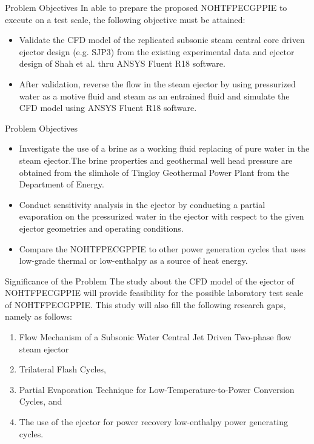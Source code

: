 \begin{frame}{Problem Objectives}
    In able to prepare the proposed NOHTFPECGPPIE to execute on a test scale, the following objective must be attained:
   \begin{itemize}
    \item Validate the CFD model of the replicated subsonic steam central core driven ejector design (e.g. SJP3) from the existing experimental data and ejector design of Shah et al. \cite{shah2014experimental} thru ANSYS Fluent R18 software.
    \item After validation, reverse the flow in the steam ejector by using pressurized water as a motive fluid and steam as an entrained fluid and simulate the CFD model using ANSYS Fluent R18 software.
  \end{itemize}
\end{frame}

\begin{frame}{Problem Objectives}
    \begin{itemize}
        \item Investigate the use of a brine as a working fluid replacing of pure water in the steam ejector.The brine properties and geothermal well head pressure are obtained from the slimhole of Tingloy Geothermal Power Plant from the Department of Energy.
        \item Conduct sensitivity analysis in the ejector by conducting a partial evaporation on the pressurized water in the ejector with respect to the given ejector geometries and operating conditions.
       \item Compare the NOHTFPECGPPIE to other power generation cycles that uses low-grade thermal or low-enthalpy as a source of heat energy.
    \end{itemize}
\end{frame}

\begin{frame}{Significance of the Problem}
    The study about the CFD model of the ejector of NOHTFPECGPPIE will provide feasibility for the possible laboratory test scale of NOHTFPECGPPIE. This study will also fill the following research gaps, namely as follows:
  \begin{enumerate}
    \item Flow Mechanism of a Subsonic Water Central Jet Driven Two-phase flow steam ejector
    \item Trilateral Flash Cycles, 
    \item Partial Evaporation Technique for Low-Temperature-to-Power Conversion Cycles, and 
    \item The use of the ejector for power recovery low-enthalpy power generating cycles.
  \end{enumerate}
\end{frame}

